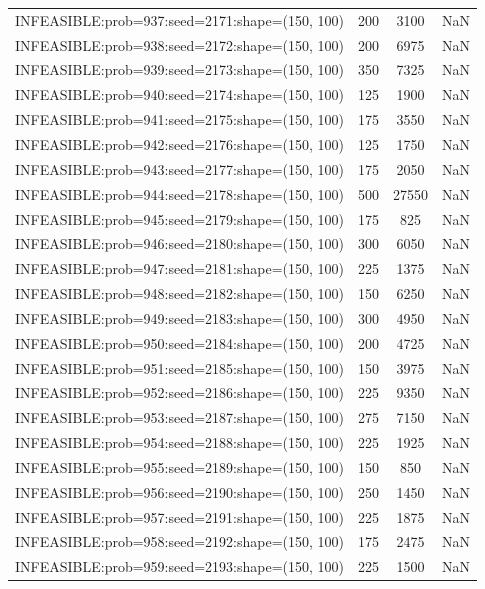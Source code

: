 \begin{longtable}{lccc}
INFEASIBLE:prob=937:seed=2171:shape=(150, 100) &      200 &  3100 &    NaN \\
INFEASIBLE:prob=938:seed=2172:shape=(150, 100) &      200 &  6975 &    NaN \\
INFEASIBLE:prob=939:seed=2173:shape=(150, 100) &      350 &  7325 &    NaN \\
INFEASIBLE:prob=940:seed=2174:shape=(150, 100) &      125 &  1900 &    NaN \\
INFEASIBLE:prob=941:seed=2175:shape=(150, 100) &      175 &  3550 &    NaN \\
INFEASIBLE:prob=942:seed=2176:shape=(150, 100) &      125 &  1750 &    NaN \\
INFEASIBLE:prob=943:seed=2177:shape=(150, 100) &      175 &  2050 &    NaN \\
INFEASIBLE:prob=944:seed=2178:shape=(150, 100) &      500 & 27550 &    NaN \\
INFEASIBLE:prob=945:seed=2179:shape=(150, 100) &      175 &   825 &    NaN \\
INFEASIBLE:prob=946:seed=2180:shape=(150, 100) &      300 &  6050 &    NaN \\
INFEASIBLE:prob=947:seed=2181:shape=(150, 100) &      225 &  1375 &    NaN \\
INFEASIBLE:prob=948:seed=2182:shape=(150, 100) &      150 &  6250 &    NaN \\
INFEASIBLE:prob=949:seed=2183:shape=(150, 100) &      300 &  4950 &    NaN \\
INFEASIBLE:prob=950:seed=2184:shape=(150, 100) &      200 &  4725 &    NaN \\
INFEASIBLE:prob=951:seed=2185:shape=(150, 100) &      150 &  3975 &    NaN \\
INFEASIBLE:prob=952:seed=2186:shape=(150, 100) &      225 &  9350 &    NaN \\
INFEASIBLE:prob=953:seed=2187:shape=(150, 100) &      275 &  7150 &    NaN \\
INFEASIBLE:prob=954:seed=2188:shape=(150, 100) &      225 &  1925 &    NaN \\
INFEASIBLE:prob=955:seed=2189:shape=(150, 100) &      150 &   850 &    NaN \\
INFEASIBLE:prob=956:seed=2190:shape=(150, 100) &      250 &  1450 &    NaN \\
INFEASIBLE:prob=957:seed=2191:shape=(150, 100) &      225 &  1875 &    NaN \\
INFEASIBLE:prob=958:seed=2192:shape=(150, 100) &      175 &  2475 &    NaN \\
INFEASIBLE:prob=959:seed=2193:shape=(150, 100) &      225 &  1500 &    NaN \\

\end{longtable}
